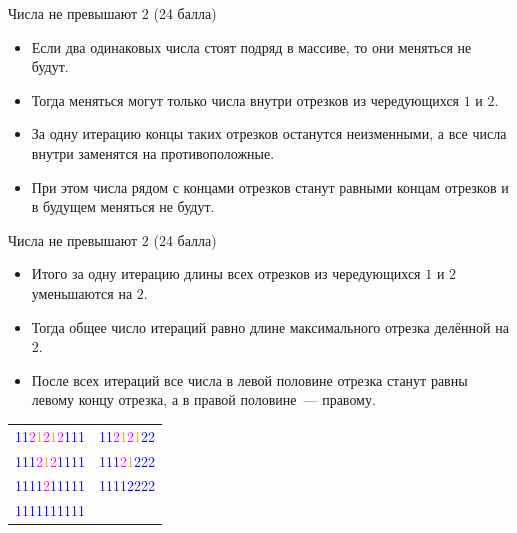 \begin{frame}{Числа не превышают $2$ (24 балла)}
  \begin{itemize}
  \item Если два одинаковых числа стоят подряд в массиве, то они меняться не будут.
  \item Тогда меняться могут только числа внутри отрезков из чередующихся $1$ и $2$.
  \item За одну итерацию концы таких отрезков останутся неизменными, а все числа внутри заменятся на противоположные.
  \item При этом числа рядом с концами отрезков станут равными концам отрезков и в будущем меняться не будут.
  \end{itemize}
\end{frame}

\begin{frame}{Числа не превышают $2$ (24 балла)}
  \begin{itemize}
  \item Итого за одну итерацию длины всех отрезков из чередующихся $1$ и $2$ уменьшаются на $2$.
  \item Тогда общее число итераций равно длине максимального отрезка делённой на $2$.
  \item После всех итераций все числа в левой половине отрезка станут равны левому концу отрезка, а в правой половине~--- правому.
  \end{itemize}

  \begin{center}
    \newcommand{\One} {\textcolor{Orange}{1}}
    \newcommand{\Two} {\textcolor{Magenta}{2}}
    
    \begin{tabular}{cc}
      \textcolor{blue}{11}\Two\One\Two\One\Two\textcolor{blue}{111} & \textcolor{blue}{11}\Two\One\Two\One\textcolor{blue}{22} \\
      \textcolor{blue}{111}\Two\One\Two\textcolor{blue}{1111} & \textcolor{blue}{111}\Two\One\textcolor{blue}{222} \\
      \textcolor{blue}{1111}\Two\textcolor{blue}{11111} & \textcolor{blue}{11112222} \\
      \textcolor{blue}{1111111111} &   \\
  \end{tabular}
  \end{center}
  
\end{frame}

